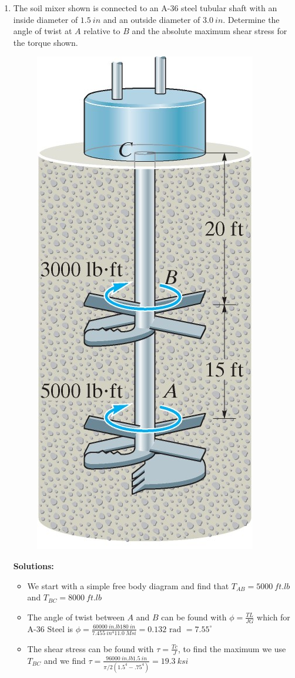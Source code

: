 \documentclass[12pt, oneside]{article}
\let\US\SI
\begin{document}
\begin{enumerate}
	\item %
		The soil mixer shown is connected to an A-36 steel tubular shaft with an inside diameter of $\US{1.5}{in}$ and an outside diameter of $\US{3.0}{in}$.
		Determine the angle of twist at $A$ relative to $B$ and the absolute maximum shear stress for the torque shown.
		\begin{figure}[H]
			\centering
			\includegraphics[width=0.2\linewidth]{5-64}
		\end{figure}
		\textbf{Solutions:}
		\begin{itemize}
			\item We start with a simple free body diagram and find that $T_{AB} = \US{5000}{ft.lb}$ and $T_{BC} = \US{8000}{ft.lb}$
			\item The angle of twist between $A$ and $B$ can be found with $\phi = \frac{TL}{JG}$ which for A-36 Steel is $\phi = \frac{\US{60000}{in.lb}\US{180}{in}}{\US{7.455}{in^4}\US{11.0}{Msi}} = 0.132 \text{ rad } = 7.55^\circ$
			\item The shear stress can be found with $\tau = \frac{Tc}{J}$, to find the maximum we use $T_{BC}$ and we find $\tau = \frac{\US{96000}{in.lb}\US{1.5}{in}}{\pi/2(1.5^4-.75^4)} = \US{19.3}{ksi}$
		\end{itemize}


\end{enumerate}
\end{document}
